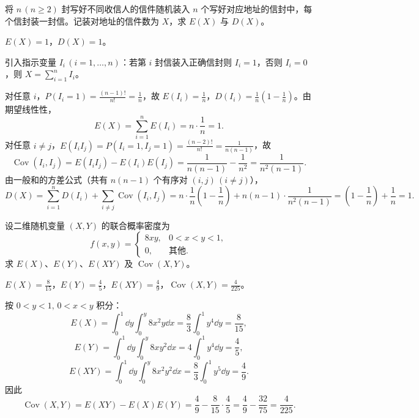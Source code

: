 \begin{exercise}
将 $n\,(n\ge 2)$ 封写好不同收信人的信件随机装入 $n$ 个写好对应地址的信封中，每个信封装一封信。记装对地址的信件数为 $X$，求 $E(X)$ 与 $D(X)$。
\begin{answer}
$E(X)=1$，$D(X)=1$。
\end{answer}
\begin{solution}
引入指示变量 $I_i\,(i=1,\ldots,n)$：若第 $i$ 封信装入正确信封则 $I_i=1$，否则 $I_i=0$，则 $X=\sum_{i=1}^{n}I_i$。

对任意 $i$，$P(I_i=1)=\frac{(n-1)!}{n!}=\frac{1}{n}$，故 $E(I_i)=\frac{1}{n}$，$D(I_i)=\frac{1}{n}\left(1-\frac{1}{n}\right)$。由期望线性性，
\[
  E(X)=\sum_{i=1}^{n}E(I_i)=n\cdot\frac{1}{n}=1.
\]
对任意 $i\ne j$，$E(I_i I_j)=P(I_i=1,I_j=1)=\frac{(n-2)!}{n!}=\frac{1}{n(n-1)}$，故
\[
  \operatorname{Cov}(I_i,I_j)=E(I_i I_j)-E(I_i)E(I_j)
  =\frac{1}{n(n-1)}-\frac{1}{n^2}=\frac{1}{n^2(n-1)}.
\]
由一般和的方差公式（共有 $n(n-1)$ 个有序对 $(i,j)\,(i\ne j)$），
\[
  D(X)=\sum_{i=1}^{n}D(I_i)+\sum_{i\ne j}\operatorname{Cov}(I_i,I_j)
  =n\cdot\frac{1}{n}\left(1-\frac{1}{n}\right)+n(n-1)\cdot\frac{1}{n^2(n-1)}
  =\left(1-\frac{1}{n}\right)+\frac{1}{n}=1.
\]
\end{solution}
\end{exercise}

\begin{exercise}
设二维随机变量 $(X,Y)$ 的联合概率密度为
\[
  f(x,y)=
  \begin{cases}
    8xy,& 0<x<y<1,\\
    0,& \text{其他}.
  \end{cases}
\]
求 $E(X)$、$E(Y)$、$E(XY)$ 及 $\operatorname{Cov}(X,Y)$。
\begin{answer}
$E(X)=\frac{8}{15}$，$E(Y)=\frac{4}{5}$，$E(XY)=\frac{4}{9}$，$\operatorname{Cov}(X,Y)=\frac{4}{225}$。
\end{answer}
\begin{solution}
按 $0<y<1,\,0<x<y$ 积分：
\[
  E(X)=\int_{0}^{1}\dd y\int_{0}^{y}8x^2 y\dd x
  =\frac{8}{3}\int_{0}^{1}y^4\dd y=\frac{8}{15},
\]
\[
  E(Y)=\int_{0}^{1}\dd y\int_{0}^{y}8x y^2\dd x
  =4\int_{0}^{1}y^4\dd y=\frac{4}{5},
\]
\[
  E(XY)=\int_{0}^{1}\dd y\int_{0}^{y}8x^2 y^2\dd x
  =\frac{8}{3}\int_{0}^{1}y^5\dd y=\frac{4}{9}.
\]
因此
\[
  \operatorname{Cov}(X,Y)=E(XY)-E(X)E(Y)=\frac{4}{9}-\frac{8}{15}\cdot\frac{4}{5}
  =\frac{4}{9}-\frac{32}{75}=\frac{4}{225}.
\]
\end{solution}
\end{exercise}

